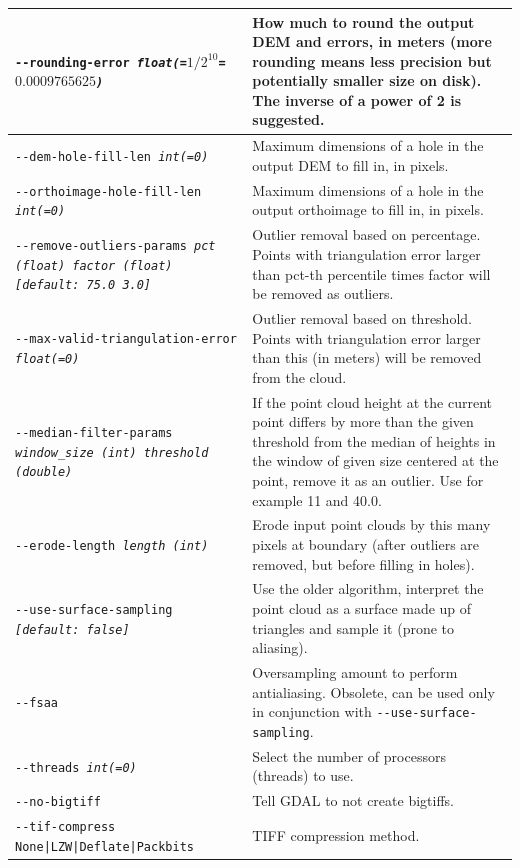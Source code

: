 \begin{longtable}{|p{8cm}|p{9cm}|}
\texttt{-\/-rounding-error \textit{float(=$1/2^{10}$=$0.0009765625$)}} & How much to round the output DEM and errors, in meters (more rounding means less precision but potentially smaller size on disk). The inverse of a power of 2 is suggested. \\ \hline
\texttt{-\/-dem-hole-fill-len \textit{int(=0)}} &  Maximum dimensions of a hole in the output DEM to fill in, in pixels. \\ \hline
\texttt{-\/-orthoimage-hole-fill-len \textit{int(=0)}} & Maximum dimensions of a hole in the output orthoimage to fill in, in pixels. \\ \hline
\texttt{-\/-remove-outliers-params  \textit{pct (float) factor (float) [default: 75.0 3.0]}} & Outlier removal based on percentage. Points with triangulation error larger than pct-th percentile times factor will be removed as outliers. \\ \hline
\texttt{-\/-max-valid-triangulation-error \textit{float(=0)}} & Outlier removal based on threshold. Points with triangulation error larger than this (in meters) will be removed from the cloud. \\ \hline
\texttt{-\/-median-filter-params \textit{window\_size (int) threshold (double)}} & If the point cloud height at the current point differs by more than the given threshold from the median of heights in the window of given size centered at the point, remove it as an outlier. Use for example 11 and 40.0.\\ \hline
\texttt{-\/-erode-length \textit{length (int)}} & Erode input point clouds by this many pixels at boundary (after outliers are removed, but before filling in holes). \\ \hline
\texttt{-\/-use-surface-sampling \textit{[default: false]}} & Use the older algorithm, interpret the point cloud as a surface made up of triangles and sample it (prone to aliasing).\\ \hline
\texttt{-\/-fsaa} & Oversampling amount to perform antialiasing. Obsolete, can be used only in conjunction with \texttt{-\/-use-surface-sampling}. \\ \hline
\texttt{-\/-threads \textit{int(=0)}} & Select the number of processors (threads) to use.\\ \hline
\texttt{-\/-no-bigtiff} & Tell GDAL to not create bigtiffs.\\ \hline
\texttt{-\/-tif-compress None|LZW|Deflate|Packbits} & TIFF compression method.\\ \hline
\hline
\end{longtable}


